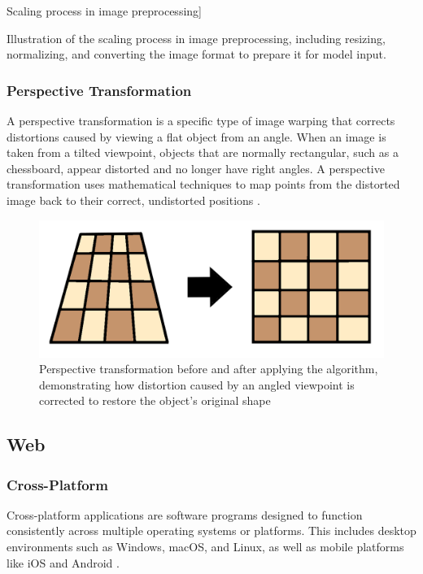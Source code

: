 Scaling process in image preprocessing]{Illustration of the scaling process in image preprocessing, including resizing, normalizing, and converting the image format to prepare it for model input.

\subsubsection*{Perspective Transformation}

A perspective transformation is a specific type of image warping that corrects distortions caused by viewing a flat object from an angle. When an image is taken from a tilted viewpoint, objects that are normally rectangular, such as a chessboard, appear distorted and no longer have right angles. A perspective transformation uses mathematical techniques to map points from the distorted image back to their correct, undistorted positions \cite{nvidia:perspective-transform}.


\begin{figure}[h!]
    \centering
    \includegraphics[width=0.75\linewidth]{figures/theory/image-recognition/perspective-transformation.png}
    \caption[Perspective transformation before and after]{Perspective transformation before and after applying the algorithm, demonstrating how distortion caused by an angled viewpoint is corrected to restore the object’s original shape \cite{nvidia:perspective-transform}}
    \label{fig:perspective-transformation}
\end{figure}



\subsection{Web}
\label{subsec:web}

\subsubsection*{Cross-Platform}
\label{subsubsec:corss-platform}

Cross-platform applications are software programs designed to function consistently across multiple operating systems or platforms. This includes desktop environments such as Windows, macOS, and Linux, as well as mobile platforms like iOS and Android \cite{sevenpeaks:cross-platform}.

}
